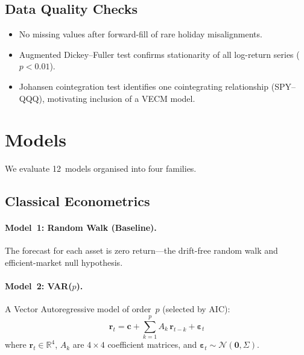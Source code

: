 \documentclass[11pt,a4paper,twocolumn]{article}
\begin{document}
\subsection{Data Quality Checks}

\begin{itemize}[leftmargin=*,itemsep=1pt]
    \item No missing values after forward-fill of rare holiday misalignments.
    \item Augmented Dickey--Fuller test confirms stationarity of all log-return
          series ($p < 0.01$).
    \item Johansen cointegration test identifies one cointegrating relationship
          (SPY--QQQ), motivating inclusion of a VECM model.
\end{itemize}


\section{Models}\label{sec:models}

We evaluate 12~models organised into four families.

\subsection{Classical Econometrics}

\paragraph{Model~1: Random Walk (Baseline).}
The forecast for each asset is zero return---the drift-free random walk and
efficient-market null hypothesis.

\paragraph{Model~2: VAR($p$).}
A Vector Autoregressive model of order~$p$ (selected by AIC):
\begin{equation}\label{eq:var}
    \mathbf{r}_t = \mathbf{c} + \sum_{k=1}^{p} A_k\,\mathbf{r}_{t-k}
                   + \bm{\varepsilon}_t
\end{equation}
where $\mathbf{r}_t \in \mathbb{R}^4$, $A_k$ are $4\!\times\!4$ coefficient
matrices, and $\bm{\varepsilon}_t \sim \mathcal{N}(\mathbf{0},\Sigma)$.
\end{document}

